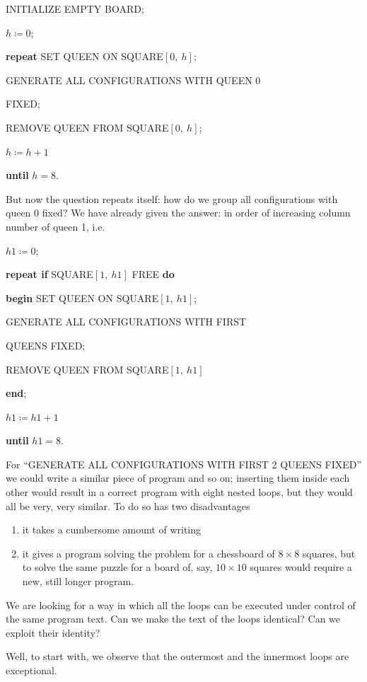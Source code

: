 INITIALIZE EMPTY BOARD;

$h \coloneq 0$;

\textbf{repeat} SET QUEEN ON SQUARE$[0,\ h]$;

\quad GENERATE ALL CONFIGURATIONS WITH QUEEN 0

\quad\quad FIXED;

\quad REMOVE QUEEN FROM SQUARE$[0,\ h]$;

\quad $h \coloneq h + 1$

\textbf{until} $h = 8$.

But now the question repeats itself: how do we group all configurations with queen 0 fixed? We have already given the answer: in order of increasing column number of queen 1, i.e.

$h1 \coloneq 0$;

\textbf{repeat if} SQUARE$[1,\ h1]$ FREE \textbf{do}

\quad \textbf{begin} SET QUEEN ON SQUARE$[1,\ h1]$;

\quad \quad GENERATE ALL CONFIGURATIONS WITH FIRST

\quad \quad {} QUEENS FIXED;

\quad \quad REMOVE QUEEN FROM SQUARE$[1,\ h1]$

\quad \textbf{end};

\quad $h1 \coloneq h1 + 1$

\textbf{until} $h1 = 8$.

For ``GENERATE ALL CONFIGURATIONS WITH FIRST 2 QUEENS FIXED'' we could write a similar piece of program and so on; inserting
them inside each other would result in a correct program with eight nested loops, but they would all be very, very similar. To do so has two disadvantages

\begin{enumerate}[wide, nosep, label=(\arabic*)]
	\item it takes a cumbersome amount of writing
	\item it gives a program solving the problem for a chessboard of $8\times 8$ squares, but to solve the same puzzle for a board of, say, $10\times 10$ squares would require a new, still longer program.
\end{enumerate}

We are looking for a way in which all the loops can be executed under control of the same program text. Can we make the text of the loops identical? Can we exploit their identity?

Well, to start with, we observe that the outermost and the innermost loops are exceptional.

